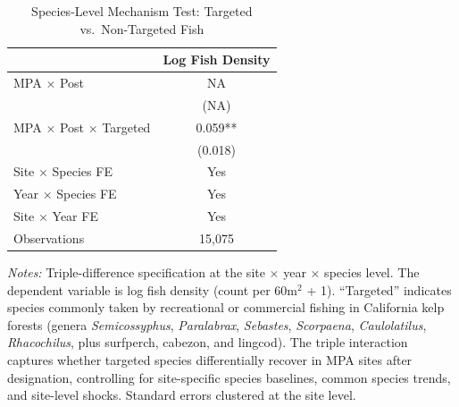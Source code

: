 \begin{table}[t]
\centering
\caption{Species-Level Mechanism Test: Targeted vs.\ Non-Targeted Fish}
\label{tab:ddd}
\begin{threeparttable}
\begin{tabular}{lc}
\toprule
 & Log Fish Density \\
\midrule
MPA $\times$ Post & NA \\
 & (NA) \\
\addlinespace
MPA $\times$ Post $\times$ Targeted & 0.059** \\
 & (0.018) \\
\addlinespace
Site $\times$ Species FE & Yes \\
Year $\times$ Species FE & Yes \\
Site $\times$ Year FE & Yes \\
Observations & 15,075 \\
\bottomrule
\end{tabular}
\begin{tablenotes}[flushleft]
\footnotesize
\item \textit{Notes:} Triple-difference specification at the site $\times$ year $\times$ species level. The dependent variable is log fish density (count per 60m$^2$ + 1). ``Targeted'' indicates species commonly taken by recreational or commercial fishing in California kelp forests (genera \textit{Semicossyphus}, \textit{Paralabrax}, \textit{Sebastes}, \textit{Scorpaena}, \textit{Caulolatilus}, \textit{Rhacochilus}, plus surfperch, cabezon, and lingcod). The triple interaction captures whether targeted species differentially recover in MPA sites after designation, controlling for site-specific species baselines, common species trends, and site-level shocks. Standard errors clustered at the site level.
\end{tablenotes}
\end{threeparttable}
\end{table}

